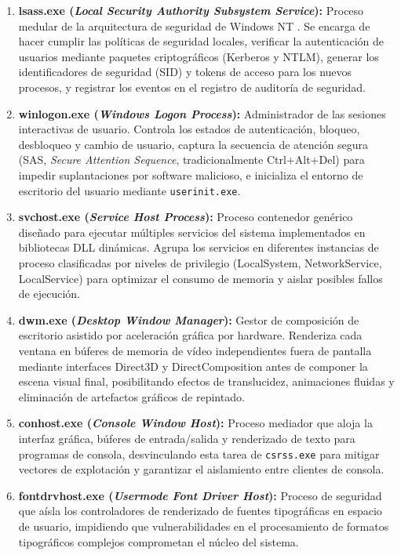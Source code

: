 \documentclass[12pt]{article}
\begin{document}
\begin{enumerate}[leftmargin=*]
    \item \textbf{lsass.exe (\textit{Local Security Authority Subsystem Service}):} Proceso medular de la arquitectura de seguridad de Windows NT \parencite[\S 21.7, p.\ 1070]{deitel2004operating}. Se encarga de hacer cumplir las políticas de seguridad locales, verificar la autenticación de usuarios mediante paquetes criptográficos (Kerberos y NTLM), generar los identificadores de seguridad (SID) y tokens de acceso para los nuevos procesos, y registrar los eventos en el registro de auditoría de seguridad.
    
    \item \textbf{winlogon.exe (\textit{Windows Logon Process}):} Administrador de las sesiones interactivas de usuario. Controla los estados de autenticación, bloqueo, desbloqueo y cambio de usuario, captura la secuencia de atención segura (SAS, \textit{Secure Attention Sequence}, tradicionalmente Ctrl+Alt+Del) para impedir suplantaciones por software malicioso, e inicializa el entorno de escritorio del usuario mediante \texttt{userinit.exe}.
    
    \item \textbf{svchost.exe (\textit{Service Host Process}):} Proceso contenedor genérico diseñado para ejecutar múltiples servicios del sistema implementados en bibliotecas DLL dinámicas. Agrupa los servicios en diferentes instancias de proceso clasificadas por niveles de privilegio (LocalSystem, NetworkService, LocalService) para optimizar el consumo de memoria y aislar posibles fallos de ejecución.
    
    \item \textbf{dwm.exe (\textit{Desktop Window Manager}):} Gestor de composición de escritorio asistido por aceleración gráfica por hardware. Renderiza cada ventana en búferes de memoria de vídeo independientes fuera de pantalla mediante interfaces Direct3D y DirectComposition antes de componer la escena visual final, posibilitando efectos de translucidez, animaciones fluidas y eliminación de artefactos gráficos de repintado.
    
    \item \textbf{conhost.exe (\textit{Console Window Host}):} Proceso mediador que aloja la interfaz gráfica, búferes de entrada/salida y renderizado de texto para programas de consola, desvinculando esta tarea de \texttt{csrss.exe} para mitigar vectores de explotación y garantizar el aislamiento entre clientes de consola.
    
    \item \textbf{fontdrvhost.exe (\textit{Usermode Font Driver Host}):} Proceso de seguridad que aísla los controladores de renderizado de fuentes tipográficas en espacio de usuario, impidiendo que vulnerabilidades en el procesamiento de formatos tipográficos complejos comprometan el núcleo del sistema.
    

\end{enumerate}
\end{document}
